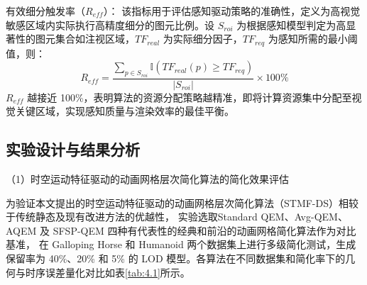 有效细分触发率（$R_{eff}$）：
该指标用于评估感知驱动策略的准确性，定义为高视觉敏感区域内实际执行高精度细分的图元比例。设 $S_{roi}$ 为根据感知模型判定为高显著性的图元集合如注视区域，$TF_{real}$ 为实际细分因子，$TF_{req}$ 为感知所需的最小阈值，则：
\begin{equation}
R_{eff} = \frac{\sum_{p \in S_{roi}} \mathbb{I}(TF_{real}(p) \geq TF_{req})}{|S_{roi}|} \times 100\%
\end{equation}
$R_{eff}$ 越接近 100\%，表明算法的资源分配策略越精准，即将计算资源集中分配至视觉关键区域，实现感知质量与渲染效率的最佳平衡。

\subsection{实验设计与结果分析}

（1）时空运动特征驱动的动画网格层次简化算法的简化效果评估

为验证本文提出的时空运动特征驱动的动画网格层次简化算法（STMF-DS）相较于传统静态及现有改进方法的优越性，
实验选取Standard QEM\cite{1-2-22}、Avg-QEM\cite{4-3-3-0}、AQEM\cite{4-3-3-1} 及 SFSP-QEM \cite{4-3-3-2}四种有代表性的经典和前沿的动画网格简化算法作为对比基准，
在 Galloping Horse 和 Humanoid 两个数据集上进行多级简化测试，生成保留率为 40\%、20\% 和 5\% 的 LOD 模型。各算法在不同数据集和简化率下的几何与时序误差量化对比如表\ref{tab:4.1}所示。

